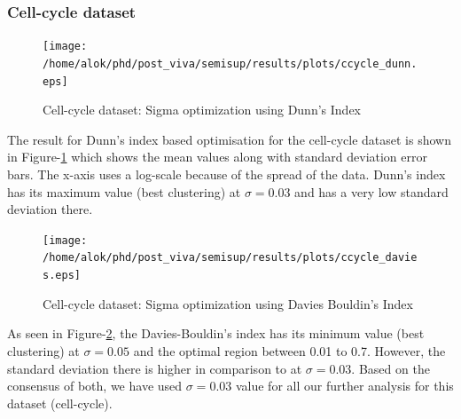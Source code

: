 \subsubsection{Cell-cycle dataset}

\begin{figure}[tp]
 \centering
 \texttt{[image: /home/alok/phd/post\_viva/semisup/results/plots/ccycle\_dunn.eps]}
 \caption{Cell-cycle dataset: Sigma optimization using Dunn's Index}
 \label{fig:ccycle_sigma_opt_dunn}
\end{figure}

The result for Dunn's index based optimisation for the cell-cycle dataset is shown in Figure-\ref{fig:ccycle_sigma_opt_dunn} which shows the mean values along with standard deviation error bars. 
The x-axis uses a log-scale because of the spread of the data.  Dunn's index has its maximum value (best clustering) at $\sigma=0.03$ and has a very low standard deviation there. 

\begin{figure}[tp]
 \centering
 \texttt{[image: /home/alok/phd/post\_viva/semisup/results/plots/ccycle\_davies.eps]}
 \caption{Cell-cycle dataset: Sigma optimization using Davies Bouldin's Index}
 \label{fig:ccycle_sigma_opt_dav}
\end{figure}

As seen in Figure-\ref{fig:ccycle_sigma_opt_dav}, the Davies-Bouldin's index has its minimum value (best clustering) at $\sigma=0.05$ and the optimal region between 0.01 to 0.7. However, the standard deviation there is higher in comparison to at $\sigma=0.03$. 
Based on the consensus of both, we have used $\sigma=0.03$ value for all our further analysis for this dataset (cell-cycle). 

